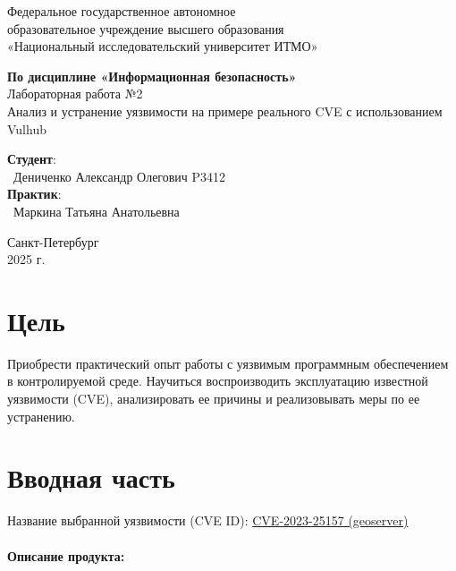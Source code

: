 \documentclass{article}
\begin{document}
\begin{center}
    \Large
    Федеральное государственное автономное \\
    образовательное учреждение высшего образования \\ 
    «Национальный исследовательский университет ИТМО»\\
    \vspace{0.5cm}
    \large
    
    \vspace{1cm}
    \Large
    \textbf{По дисциплине «Информационная безопасность»} \\
        Лабораторная работа №2\\
        Анализ и устранение уязвимости на примере
реального CVE с использованием Vulhub
    \large
    \vspace{8cm}

    \begin{minipage}{.33\textwidth}
    \end{minipage}
    \hfill
    \begin{minipage}{.4\textwidth}
    
        \textbf{Студент}: \vspace{.1cm} \\
        \ Дениченко Александр Олегович P3412\\
        \textbf{Практик}:  \\
        \ Маркина Татьяна Анатольевна
    \end{minipage}
    \vfill
Санкт-Петербург\\ 2025 г.
\end{center}
\pagestyle{empty}
\newpage
\pagestyle{plain}

\section*{Цель}

Приобрести практический опыт работы с уязвимым программным обеспечением в
контролируемой среде. Научиться воспроизводить эксплуатацию известной уязвимости (CVE),
анализировать ее причины и реализовывать меры по ее устранению.

\section{Вводная часть}

Название выбранной уязвимости (CVE ID): \href{https://github.com/vulhub/vulhub/tree/master/geoserver/CVE-2023-25157}{CVE-2023-25157 (geoserver)}
\\ \\
\textbf{Описание продукта:}
\end{document}
